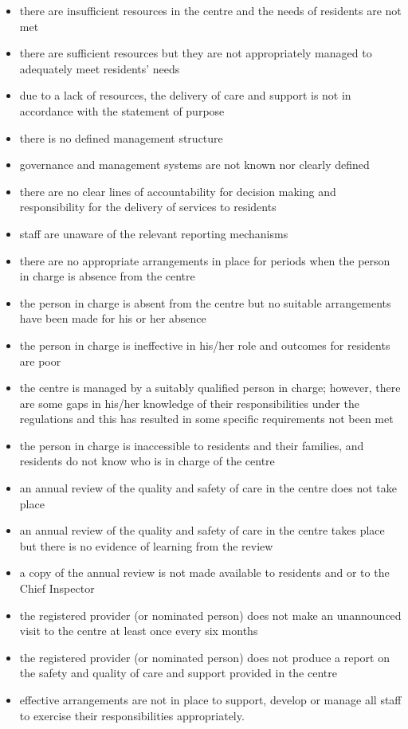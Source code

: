 \documentclass[a4paper,11pt,twoside]{article}
\begin{document}
\begin{itemize}
\item there are insufficient resources in the centre and the needs of residents are not met
\item there are sufficient resources but they are not appropriately managed to adequately meet residents’ needs
\item due to a lack of resources, the delivery of care and support is not in accordance with the statement of purpose
\item there is no defined management structure
\item governance and management systems are not known nor clearly defined
\item there are no clear lines of accountability for decision making and responsibility for the delivery of services to residents
\item staff are unaware of the relevant reporting mechanisms
\item there are no appropriate arrangements in place for periods when the person in charge is absence from the centre
\item the person in charge is absent from the centre but no suitable arrangements have been made for his or her absence
\item the person in charge is ineffective in his/her role and outcomes for residents are poor
\item the centre is managed by a suitably qualified person in charge; however, there are some gaps in his/her knowledge of their responsibilities under the regulations and this has resulted in some specific requirements not been met
\item the person in charge is inaccessible to residents and their families, and residents do not know who is in charge of the centre
\item an annual review of the quality and safety of care in the centre does not take place
\item an annual review of the quality and safety of care in the centre takes place but there is no evidence of learning from the review
\item a copy of the annual review is not made available to residents and or to the Chief Inspector
\item the registered provider (or nominated person) does not make an unannounced visit to the centre at least once every six months
\item the registered provider (or nominated person) does not produce a report on the safety and quality of care and support provided in the centre
\item effective arrangements are not in place to support, develop or manage all staff to exercise their responsibilities appropriately.
\end{itemize}
\end{document}
